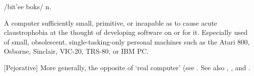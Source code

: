  /bit'ee boks/ n.

\begin{inparaenum}
    \item A computer sufficiently small, primitive, or incapable as to cause
        acute claustrophobia at the thought of developing software on or for it.
        Especially used of small, obsolescent, single-tasking-only personal
        machines such as the Atari 800, Osborne, Sinclair, VIC-20, TRS-80, or
        IBM PC.
    \item {[}Pejorative] More generally, the opposite of `real computer' (see
        . See also ,
        , and .
\end{inparaenum}

